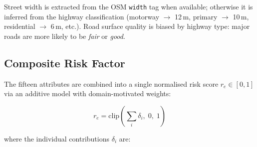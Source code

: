 ﻿\documentclass[a4paper, 12pt]{article}
\theoremstyle{remark}
\begin{document}
Street width is extracted from the OSM \texttt{width} tag when available; otherwise it is inferred from the highway classification (motorway $\to$ 12\,m, primary $\to$ 10\,m, residential $\to$ 6\,m, etc.). Road surface quality is biased by highway type: major roads are more likely to be \emph{fair} or \emph{good}.

\subsection{Composite Risk Factor}

The fifteen attributes are combined into a single normalised risk score $r_e \in [0, 1]$ via an additive model with domain-motivated weights:

\begin{equation}
r_e = \text{clip}\!\left(\sum_{i} \delta_i,\; 0,\; 1\right)
\label{eq:risk}
\end{equation}

where the individual contributions $\delta_i$ are:
\end{document}

